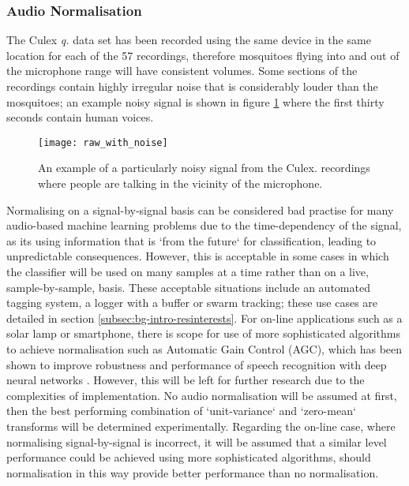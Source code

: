         \subsubsection{Audio Normalisation}
        \label{subsubsec:exp-clf-ass-aud}
            The Culex \textit{q.} data set has been recorded using the same device in the same location for each of the 57 recordings, therefore mosquitoes flying into and out of the microphone range will have consistent volumes. Some sections of the recordings contain highly irregular noise that is considerably louder than the mosquitoes; an example noisy signal is shown in figure \ref{fig:exp-clf-audio-noisy} where the first thirty seconds contain human voices.
            \begin{figure}[ht]
                \centering
                \texttt{[image: raw\_with\_noise]}
                \caption{An example of a particularly noisy signal from the Culex. recordings where people are talking in the vicinity of the microphone.}
                \label{fig:exp-clf-audio-noisy}
            \end{figure}
            Normalising on a signal-by-signal basis can be considered bad practise for many audio-based machine learning problems due to the time-dependency of the signal, as its using information that is `from the future` for classification, leading to unpredictable consequences. However, this is acceptable in some cases in which the classifier will be used on many samples at a time rather than on a live, sample-by-sample, basis. These acceptable situations include an automated tagging system, a logger with a buffer or swarm tracking; these use cases are detailed in section \ref{subsec:bg-intro-resinterests}. For on-line applications such as a solar lamp or smartphone, there is scope for use of more sophisticated algorithms to achieve normalisation such as Automatic Gain Control (AGC), which has been shown to improve robustness and performance of speech recognition with deep neural networks \cite{Prabhavalkar2015}. However, this will be left for further research due to the complexities of implementation. No audio normalisation will be assumed at first, then the best performing combination of `unit-variance` and `zero-mean` transforms will be determined experimentally. Regarding the on-line case, where normalising signal-by-signal is incorrect, it will be assumed that a similar level performance could be achieved using more sophisticated algorithms, should normalisation in this way provide better performance than no normalisation.

